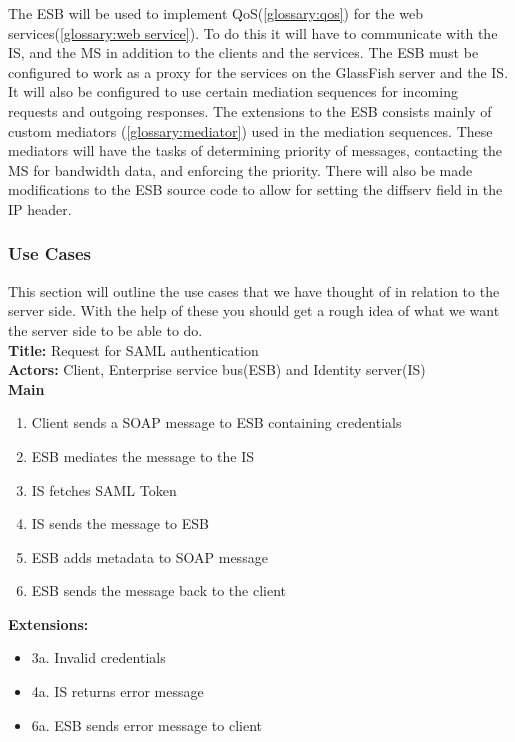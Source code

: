     The ESB will be used to implement QoS(\ref{glossary:qos}) for the web services(\ref{glossary:web service}). To do this it will have to communicate with the IS, and the MS in addition to the clients and the services. The ESB must be configured to work as a proxy for the services on the GlassFish server and the IS. It will also be configured to use certain mediation sequences for incoming requests and outgoing responses. The extensions to the ESB consists mainly of custom mediators (\ref{glossary:mediator}) used in the mediation sequences. These mediators will have the tasks of determining priority of messages, contacting the MS for bandwidth data, and enforcing the priority. There will also be made modifications to the ESB source code to allow for setting the diffserv field in the IP header.
    
    \subsubsection{Use Cases}\label{Server Use Cases}
    This section will outline the use cases that we have thought of in relation to the server side. With the help of these you should get a rough idea of what we want the server side to be able to do.\\
    \textbf{Title:} Request for SAML authentication \\
    \textbf{Actors:} Client, Enterprise service bus(ESB) and Identity server(IS)\\
    \textbf{Main}
    \begin{enumerate}
        \item Client sends a SOAP message to ESB containing credentials
        \item ESB mediates the message to the IS
        \item IS fetches SAML Token
        \item IS sends the message to ESB
        \item ESB adds metadata to SOAP message
        \item ESB sends the message back to the client
    \end{enumerate}
    \textbf{Extensions:}
    \begin{itemize}
        \item[] 3a. Invalid credentials 
        \item[] 4a. IS returns error message
        \item[] 6a. ESB sends error message to client
    \end{itemize}
